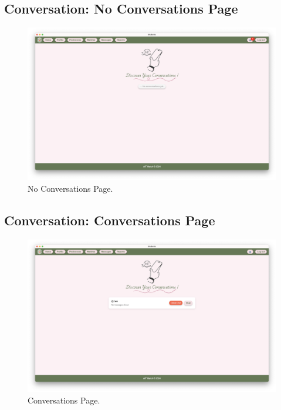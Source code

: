         \subsection{Conversation: No Conversations Page}
        \begin{figure}[h]
                \centering
                \captionsetup{justification=centering, singlelinecheck=false, labelsep=space}
                \includegraphics[width=5in]{figures/results/conversations/no-conversation-page.png} 
                \caption{No Conversations Page.}
                \label{fig:no-conversation-page.png}
            \end{figure}

        \subsection{Conversation: Conversations Page}
        \begin{figure}[h]
                \centering
                \captionsetup{justification=centering, singlelinecheck=false, labelsep=space}
                \includegraphics[width=5in]{figures/results/conversations/conversation-page.png} 
                \caption{Conversations Page.}
                \label{fig:conversation-page.png}
            \end{figure}
        \newpage
